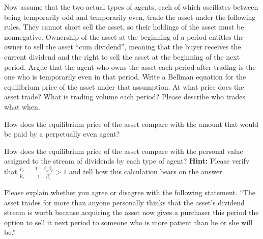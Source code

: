 \medskip
{}  Now assume that the  two actual types of agents, each of which oscillates between being temporarily odd and temporarily even,  trade the asset
under the following rules. They cannot short sell the asset, so their holdings of the asset must be nonnegative.  Ownership of the asset at the beginning of a period entitles the owner to sell the asset ``cum dividend'', meaning that the buyer
receives the current dividend and the right to sell the asset at the beginning of the next period.
Argue  that the agent who owns  the asset each period after trading  is the one who is temporarily even in that period.  Write a Bellman equation for the equilibrium price
of the asset under that assumption.
At what price does the asset trade? What is trading volume each period?  Please describe who trades what when.

\medskip
{}  How does the equilibrium price of the asset compare with the amount that would be paid by a perpetually even agent?

\medskip
{} How does the equilibrium price of the asset compare with the personal value  assigned  to the stream of dividends  by each type of agent?
{\bf Hint:} Please verify  that ${\frac{\bar p_e}{p_e}} = {\frac{ 1- \beta_o \beta_e}{1 - \beta_e^2}} >1$ and tell how this calculation bears on the answer.

\medskip
{}  Please explain whether you agree or disagree with the following statement.  ``The asset trades for more than anyone personally thinks that the asset's dividend stream is worth because
acquiring the asset now gives a purchaser this period  the option to sell it next period to someone who is more patient than  he or she will be.''







\bye






\bye
